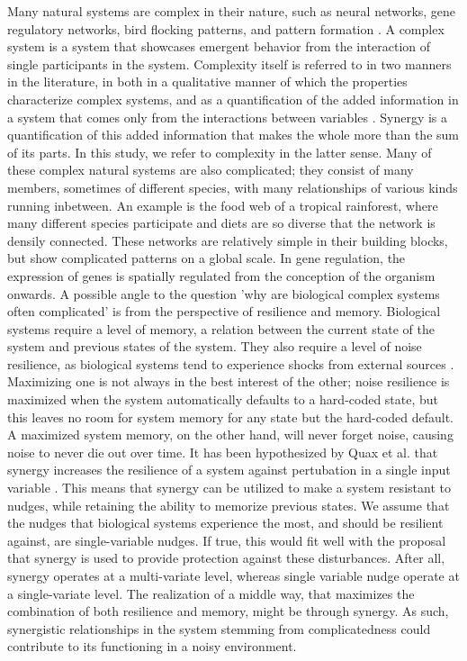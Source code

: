 \documentclass[../main.tex]{subfiles}
\begin{document}
Many natural systems are complex in their nature, such as neural networks, gene regulatory networks, bird flocking patterns, and pattern formation \cite{choi2001supply, gat1999synergy, kondo2010reaction, liang2008gene}.
A complex system is a system that showcases emergent behavior from the interaction of single participants in the system.
Complexity itself is referred to in two manners in the literature, in both in a qualitative manner of which the properties characterize complex systems, and as a quantification of the added information in a system that comes only from the interactions between variables \cite{bar2004multiscale}.
Synergy is a quantification of this added information that makes the whole more than the sum of its parts.
In this study, we refer to complexity in the latter sense.
Many of these complex natural systems are also complicated; they consist of many members, sometimes of different species, with many relationships of various kinds running inbetween.
An example is the food web of a tropical rainforest, where many different species participate and diets are so diverse that the network is densily connected.
These networks are relatively simple in their building blocks, but show complicated patterns on a global scale.
In gene regulation, the expression of genes is spatially regulated from the conception of the organism onwards.
A possible angle to the question 'why are biological complex systems often complicated' is from the perspective of resilience and memory.
Biological systems require a level of memory, a relation between the current state of the system and previous states of the system. 
They also require a level of noise resilience, as biological systems tend to experience shocks from external sources \cite{peixoto2012emergence}. %
Maximizing one is not always in the best interest of the other; noise resilience is maximized when the system automatically defaults to a hard-coded state, but this leaves no room for system memory for any state but the hard-coded default.
A maximized system memory, on the other hand, will never forget noise, causing noise to never die out over time.
It has been hypothesized by Quax et al. that synergy increases the resilience of a system against pertubation in a single input variable \cite{quax2017quantifying}.
This means that synergy can be utilized to make a system resistant to nudges, while retaining the ability to memorize previous states.
We assume that the nudges that biological systems experience the most, and should be resilient against, are single-variable nudges.
If true, this would fit well with the proposal that synergy is used to provide protection against these disturbances.
After all, synergy operates at a multi-variate level, whereas single variable nudge operate at a single-variate level.
The realization of a middle way, that maximizes the combination of both resilience and memory, might be through synergy.
As such, synergistic relationships in the system stemming from complicatedness could contribute to its functioning in a noisy environment.
\end{document}
